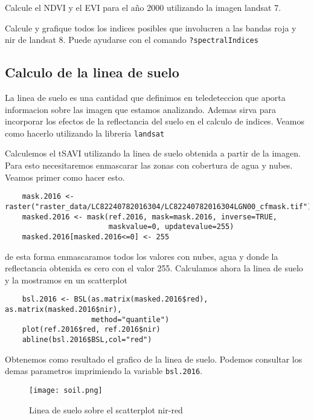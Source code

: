 \begin{act}
    Calcule el NDVI y el EVI para el año 2000 utilizando la imagen landsat 7.
\end{act}

\begin{act}
    Calcule y grafique todos los indices posibles que involucren a las bandas
    roja y nir de landsat 8. Puede ayudarse con el comando
    \texttt{?spectralIndices}
\end{act}

\subsection{Calculo de la linea de suelo}

La linea de suelo es una cantidad que definimos en teledeteccion que aporta
informacion sobre las imagen que estamos analizando. Ademas sirva para incorporar
los efectos de la reflectancia del suelo en el calculo de indices.
Veamos como hacerlo utilizando la libreria
\texttt{landsat}

\begin{exa}
    Calculemos el tSAVI utilizando la linea de suelo obtenida a
    partir de la imagen. Para esto necesitaremos enmascarar las zonas con
    cobertura de agua y nubes. Veamos primer como hacer esto.
    \begin{lstlisting}
    mask.2016 <- raster("raster_data/LC82240782016304/LC82240782016304LGN00_cfmask.tif")
    masked.2016 <- mask(ref.2016, mask=mask.2016, inverse=TRUE,
                        maskvalue=0, updatevalue=255)
    masked.2016[masked.2016<=0] <- 255
    \end{lstlisting}
    de esta forma enmascaramos todos los valores con nubes, agua y donde la
    reflectancia obtenida es cero con el valor 255.
    Calculamos ahora la linea de suelo y la mostramos en un scatterplot
    \begin{lstlisting}
    bsl.2016 <- BSL(as.matrix(masked.2016$red), as.matrix(masked.2016$nir),
                    method="quantile")
    plot(ref.2016$red, ref.2016$nir)
    abline(bsl.2016$BSL,col="red")
    \end{lstlisting}
    Obtenemos como resultado el grafico de la linea de suelo. Podemos consultar
    los demas parametros imprimiendo la variable \texttt{bsl.2016}.
    \begin{figure}[h!]
    \begin{center}
        \texttt{[image: soil.png]}
    \end{center}
    \caption{Linea de suelo sobre el scatterplot nir-red}
    \label{fig:soil}
    \end{figure}

\end{exa}

